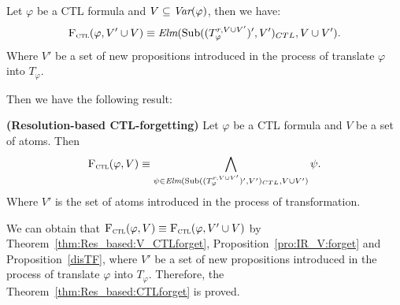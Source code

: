 \documentclass{article}
\begin{document}
\begin{theorem}\label{thm:Res_based:V_CTLforget}
Let $\varphi$ be a CTL formula and $V \subseteq \textit{Var}(\varphi)$, then we have:
\[
{\textsc{F}_{\textsc{ctl}}}(\varphi, V' \cup V) \equiv \textit{Elm} (\textrm{Sub}((T_{\varphi}^{r,V \cup V'})', V')_{CTL}, V \cup V').
\]
Where $V'$ be a set of new propositions introduced in the process of translate $\varphi$ into $T_{\varphi}$.
\end{theorem}
%

 Then we have the following result:
\begin{theorem}\label{thm:Res_based:CTLforget}
\textbf{(Resolution-based CTL-forgetting)}
Let $\varphi$ be a CTL formula and $V$ be a set of atoms. Then
\[
{\textsc{F}_{\textsc{ctl}}}(\varphi, V) \equiv \bigwedge_{\psi \in \textit{Elm} (\textrm{Sub}((T_{\varphi}^{r,V \cup V'})', V')_{CTL}, V \cup V')} \psi.
\]
Where $V'$ is the set of atoms introduced in the process of transformation.
\end{theorem}

We can obtain that ${\textsc{F}_{\textsc{ctl}}}(\varphi, V) \equiv {\textsc{F}_{\textsc{ctl}}}(\varphi, V' \cup V)$ by Theorem~\ref{thm:Res_based:V_CTLforget}, Proposition~\ref{pro:IR_V:forget} and Proposition~\ref{disTF}, where $V'$ be a set of new propositions introduced in the process of translate $\varphi$ into $T_{\varphi}$. Therefore, the Theorem~\ref{thm:Res_based:CTLforget} is proved.
\end{document}
